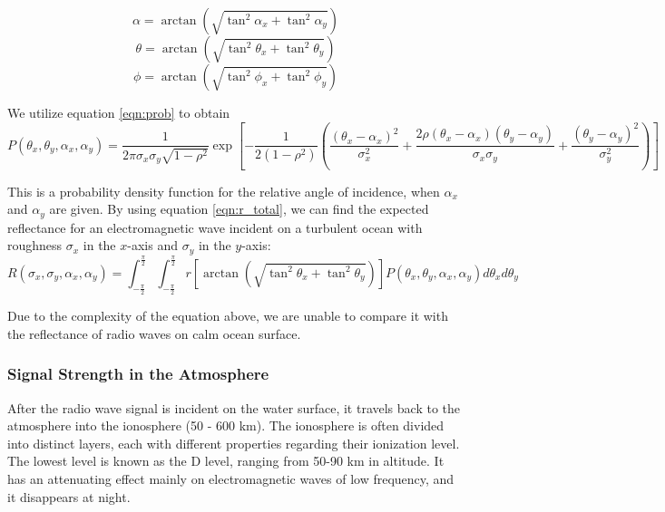\documentclass{article}
\begin{document}
\begin{equation}\label{eqn:alpha_rel}
    \alpha = \arctan\left(\sqrt{\tan^2\alpha_x + \tan^2\alpha_y}\right)
\end{equation}
\begin{equation}\label{eqn:theta_rel}
    \theta = \arctan\left(\sqrt{\tan^2\theta_x + \tan^2\theta_y}\right)
\end{equation}
\begin{equation}
    \phi = \arctan\left(\sqrt{\tan^2\phi_x + \tan^2\phi_y}\right)
\end{equation}

We utilize equation \eqref{eqn:prob} to obtain
\begin{equation}
    P(\theta_x,\theta_y, \alpha_x, \alpha_y) = \frac{1}{2\pi \sigma_x \sigma_y \sqrt{1 - \rho^2}} \exp\left[-\frac{1}{2(1-\rho^2)}\left(\frac{(\theta_x - \alpha_x)^2}{\sigma_x^2} + \frac{2\rho (\theta_x - \alpha_x) (\theta_y - \alpha_y)}{\sigma_x \sigma_y} + \frac{(\theta_y - \alpha_y)^2}{\sigma_y^2}\right)\right]
\end{equation}

This is a probability density function for the relative angle of incidence, when $\alpha_x$ and $\alpha_y$ are given. By using equation \eqref{eqn:r_total}, we can find the expected reflectance for an electromagnetic wave incident on a turbulent ocean with roughness $\sigma_x$ in the $x$-axis and $\sigma_y$ in the $y$-axis:
\begin{equation}
    R\left(\sigma_x,\sigma_y,\alpha_x,\alpha_y\right) = \int_{-\frac{\pi}{2}}^\frac{\pi}{2} \int_{-\frac{\pi}{2}}^\frac{\pi}{2} r\left[\arctan\left(\sqrt{\tan^2\theta_x + \tan^2\theta_y}\right)\right] P\left(\theta_x, \theta_y, \alpha_x, \alpha_y \right) d\theta_x d\theta_y
\end{equation}

Due to the complexity of the equation above, we are unable to compare it with the reflectance of radio waves on calm ocean surface.

\subsubsection{Signal Strength in the Atmosphere} 

After the radio wave signal is incident on the water surface, it travels back to the atmosphere into the ionosphere (50 - 600 km). The ionosphere is often divided into distinct layers, each with different properties regarding their ionization level. The lowest level is known as the D level, ranging from 50-90 km in altitude. It has an attenuating effect mainly on electromagnetic waves of low frequency, and it disappears at night.
\end{document}
